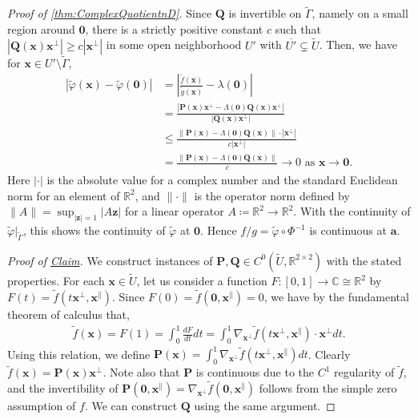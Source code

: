 \documentclass{article}
\newcommand{\Albert}[1]{{\color[rgb]{0.2,0.4,0.8}\textbf{Albert: } #1}}
\theoremstyle{theorem}
\theoremstyle{definition}
\def\CC{\mathbb{C}}
\def\RR{\mathbb{R}}
\def\bP{\mathbf{P}}
\def\bQ{\mathbf{Q}}
\def\ba{\mathbf{a}}
\def\bx{\mathbf{x}}
\def\bz{\mathbf{z}}
\def\bzero{\mathbf{0}}
\begin{document}
\begin{proof}[Proof of \autoref{thm:ComplexQuotientnD}]
Since $\bQ$ is invertible on $\tilde \Gamma$, namely on a small region around $\bzero$, there is a strictly positive constant $c$ such that $|\bQ(\bx)\bx^\perp|\geq c |\bx^\perp|$ in some open neighborhood $U'$ with $\overline{U'}\subsetneq \tilde U$.
Then, we have for $\bx\in U'\setminus\tilde \Gamma$, 
    \begin{align*}
        \left|\tilde\varphi(\bx)-\tilde \varphi(\bzero)\right|
        & =\left|\frac{\tilde f(\bx)}{\tilde g(\bx)}- \lambda(\bzero)\right|\\
        &=\frac{| \bP(\bx)\bx^\perp -\Lambda(\bzero)\bQ(\bx)\bx^\perp|}{|\bQ(\bx)\bx^\perp|}\\
        & \leq  \frac{ \| \bP(\bx) -\Lambda(\bzero)\bQ(\bx)\|\cdot |\bx^\perp|}{c|\bx^\perp|}\\
        & = \frac{\| \bP(\bx) -\Lambda(\bzero)\bQ(\bx)\|}{c} \to 0 \text{ as }\bx\to \bzero.
    \end{align*}
    Here $|\cdot|$ is the absolute value for a complex number and the standard Euclidean norm for an element of $\RR^2$, and  $\|\cdot\|$ is the operator norm defined by $\| A\|=\sup_{|\bz|=1} |A\bz|$ for a linear operator $A\coloneqq \RR^2 \to \RR^2$.  
   With the continuity of $\tilde\varphi|_{\tilde \Gamma}$,
   this shows the continuity of $\tilde\varphi$ at $\bzero$.  Hence \(f/g = \tilde\varphi \circ\Phi^{-1}\) is continuous at \(\ba\).

\vspace{5pt}
\noindent\emph{Proof of \hyperref[cl:P and Q]{Claim}.}  
We construct instances of $\bP,\bQ\in C^0(\tilde U, \RR^{2\times 2})$ with the stated properties.
For each $\bx\in\tilde U$, let us consider a function $F:[0,1]\to \CC\cong \RR^2$ by $F(t)= \tilde f(t\bx^\perp, \bx^\parallel)$. Since $F(0)=\tilde f(\bzero, \bx^\parallel)=0$, we have by the fundamental theorem of calculus that,
\begin{align*}
    \tilde f(\bx)=F(1)=\int^1_0 \frac{dF}{dt} dt 
    =\int^1_0 \nabla_{\bx^\perp}\tilde f(t\bx^\perp,\bx^\parallel) \cdot \bx^\perp dt. 
\end{align*}
 Using this relation, we define $\bP(\bx) = \int^1_0 \nabla_{\bx^\perp}\tilde f(t\bx^\perp,\bx^\parallel) dt$. Clearly $\tilde f(\bx)=\bP(\bx)\bx^\perp$. Note also that $\bP$ is continuous due to the $C^1$ regularity of $\tilde f$, and the invertibility of $\bP(\bzero,\bx^\parallel)=\nabla_{\bx^\perp}\tilde f(\bzero,\bx^\parallel)$ follows from the simple zero assumption of $f$. We can construct $\bQ$ using the same argument.



\end{proof}
\end{document}
